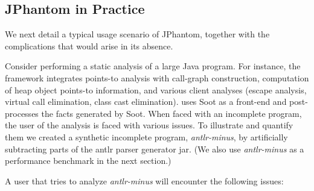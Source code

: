 

\subsection{JPhantom in Practice}

We next detail a typical usage scenario of JPhantom, together with the
complications that would arise in its absence.

Consider performing a static analysis of a large Java program. For
instance, the \doop{} framework
\cite{oopsla/BravenboerS09,pldi/KastrinisS13} integrates points-to
analysis with call-graph construction, computation of heap object
points-to information, and various client analyses (escape analysis,
virtual call elimination, class cast elimination). \doop{} uses Soot
as a front-end and post-processes the facts generated by Soot. When
faced with an incomplete program, the user of the analysis is faced
with various issues. To illustrate and quantify them we created a
synthetic incomplete program, \emph{antlr-minus}, by artificially
subtracting parts of the antlr parser generator jar. (We also use
\emph{antlr-minus} as a performance benchmark in the next section.)

A user that tries to analyze \emph{antlr-minus} will encounter the
following issues:

